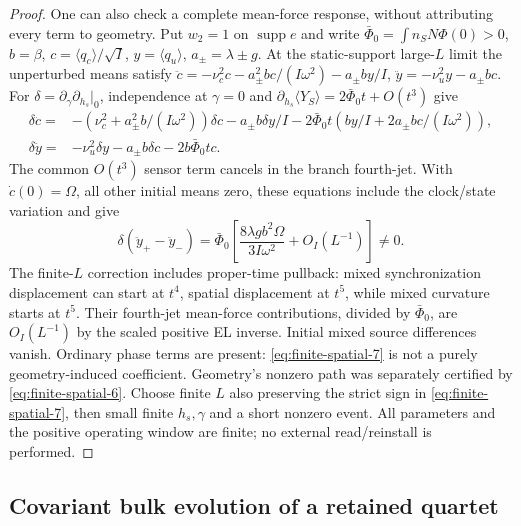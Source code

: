 \begin{proof}
One can also check a complete mean-force response, without attributing
every term to geometry. Put $w_2=1$ on $\operatorname{supp}e$ and write
$\bar\Phi_0=\int n_SN\Phi(0)>0$, $b=\beta$, $c=\langle q_c\rangle/\sqrt I$,
$y=\langle q_u\rangle$, $a_\pm=\lambda\pm g$.
At the static-support large-$L$ limit the unperturbed means satisfy
$\ddot c=-\nu_c^2c-a_\pm^2bc/(I\omega^2)-a_\pm by/I$,
$\ddot y=-\nu_u^2y-a_\pm bc$.
For $\delta=\partial_\gamma\partial_{h_s}|_0$, independence at $\gamma=0$
and $\partial_{h_s}\langle Y_S\rangle=2\bar\Phi_0t+O(t^3)$ give
\begin{align*}
 \delta\ddot c={}&-(\nu_c^2+a_\pm^2b/(I\omega^2))\delta c
 -a_\pm b\delta y/I-2\bar\Phi_0t(by/I+2a_\pm bc/(I\omega^2)),\\
 \delta\ddot y={}&-\nu_u^2\delta y-a_\pm b\delta c
                       -2b\bar\Phi_0t c .
\end{align*}
The common $O(t^3)$ sensor term cancels in the branch fourth-jet.
With $\dot c(0)=\Omega$, all other initial means zero, these equations
include the clock/state variation and give
\begin{equation}
 [t^4]\delta(\ddot y_+-\ddot y_-)
 =\bar\Phi_0\left[\frac{8\lambda g b^2\Omega}{3I\omega^2}
                         +O_I(L^{-1})\right]\ne0 .           \label{eq:finite-spatial-7}
\end{equation}
The finite-$L$ correction includes proper-time pullback: mixed
synchronization displacement can start at $t^4$, spatial displacement
at $t^5$, while mixed curvature starts at $t^5$.
Their fourth-jet mean-force contributions, divided by $\bar\Phi_0$,
are $O_I(L^{-1})$ by the scaled positive EL inverse. Initial mixed
source differences vanish. Ordinary phase terms are present: \eqref{eq:finite-spatial-7} is
not a purely geometry-induced coefficient. Geometry's nonzero path
was separately certified by \eqref{eq:finite-spatial-6}.
Choose finite $L$ also preserving the strict sign in \eqref{eq:finite-spatial-7}, then small
finite $h_s,\gamma$ and a short nonzero event. All parameters and the
positive operating window are finite; no external read/reinstall is
performed.
\end{proof}

\subsection{Covariant bulk evolution of a retained quartet}
\label{app:covariant-quartet-bulk}

